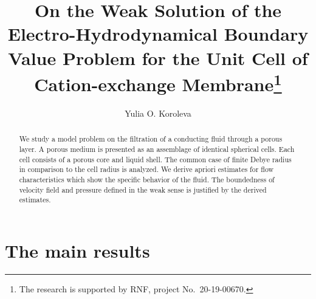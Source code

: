 \documentclass[12pt]{llncs}
\begin{document}
%
\fi

\title{ On the Weak Solution of the Electro-Hydrodynamical Boundary Value Problem for the Unit Cell of Cation-exchange Membrane\thanks{The research is supported by RNF, project No.~20-19-00670.}}
\author{Yulia O. Koroleva 
}

\maketitle

\begin{abstract}
We study a model problem on the filtration of a conducting fluid through a porous layer. A porous medium is presented as an
assemblage of identical spherical cells. Each cell consists of a porous core and liquid shell.
The common case of finite Debye radius in comparison to the cell radius is analyzed. We derive apriori estimates for flow characteristics which show the specific behavior of the fluid. The boundedness of velocity field and pressure defined in the weak sense is justified by the derived estimates.

\end{abstract}

\section{The main results}
\end{document}
